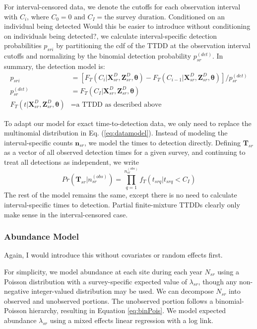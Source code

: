 \documentclass[useAMS,usenatbib,referee,12pt]{article}
\newcommand{\jarad}[1]{{\color{red} #1}}
\newcommand{\vn}{\textbf{n}}
\begin{document}
For interval-censored data, we denote the cutoffs for each observation interval with $C_i$, where $C_0 = 0 \text{ and } C_I = \text{the survey duration}$.  Conditioned on an individual being detected \jarad{Would this be easier to introduce without conditioning on individuals being detected?}, we calculate interval-specific detection probabilities $p_{sri}$ by partitioning the cdf of the TTDD at the observation interval cutoffs and normalizing by the binomial detection probability $p_{sr}^{(det)}$.  In summary, the detection model is:
\begin{align}
p_{sri} &= \left[F_T(C_i|\textbf{X}_{sr}^D, \textbf{Z}_{sr}^D, \boldsymbol{\theta}) - F_T(C_{i-1}|\textbf{X}_{sr}^D, \textbf{Z}_{sr}^D, \boldsymbol{\theta})\right]\big/p_{sr}^{(det)}\\
\label{eq:pdet}p_{sr}^{(det)} &= F_T(C_I|\textbf{X}_{sr}^D, \textbf{Z}_{sr}^D, \boldsymbol{\theta})\\
F_T(t|\textbf{X}_{sr}^D, \textbf{Z}_{sr}^D, \boldsymbol{\theta}) &= \text{a TTDD as described above}
\end{align}

To adapt our model for exact time-to-detection data, we only need to replace the multinomial distribution in Eq. (\ref{eq:datamodel}).  Instead of modeling the interval-specific counts $\vn_{sr}$, we model the times to detection directly.  Defining $\textbf{T}_{sr}$ as a vector of all observed detection times for a given survey, and continuing to treat all detections as independent, we write
\[
Pr\left(\textbf{T}_{sr}|n_{sr}^{(obs)}\right) = \prod\limits_{q=1}^{n_{sr}^{(obs)}} f_T(t_{srq}|t_{srq}<C_I)
\]
The rest of the model remains the same, except there is no need to calculate interval-specific times to detection.  Partial finite-mixture TTDDs clearly only make sense in the interval-censored case.




\subsubsection{Abundance Model}

\jarad{Again, I would introduce this without covariates or random effects first.}

For simplicity, we model abundance at each site during each year $N_{sr}$ using a Poisson distribution with a survey-specific expected value of $\lambda_{sr}$, though any non-negative integer-valued distribution may be used.  We can decompose $N_{sr}$ into observed and unobserved portions.  The unobserved portion follows a binomial-Poisson hierarchy, resulting in Equation \ref{eq:binPois}.  We model expected abundance $\lambda_{sr}$ using a mixed effects linear regression with a log link.
\end{document}
